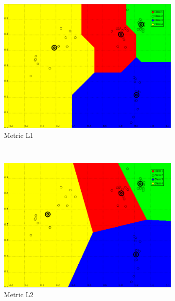 \documentclass[a4paper,10pt]{article}
\begin{document}
\begin{figure}[H]
\centering
    \begin{subfigure}[t]{0.2\textwidth}
      \centering
      \includegraphics[width=\textwidth]{pictures/dataset_1_Kmeans-4K-L1}
      \caption{Metric L1}
      \label{fig:dataset_1_Kmeans-4K-L1}
     \end{subfigure}
      ~
    \begin{subfigure}[t]{0.2\textwidth}
      \centering
      \includegraphics[width=\textwidth]{pictures/dataset_1_Kmeans-4K-L2}
      \caption{Metric L2}
      \label{fig:dataset_1_Kmeans-4K-L2}
     \end{subfigure}
      ~
    \begin{subfigure}[t]{0.2\textwidth}

\end{subfigure}
\end{figure}
\end{document}
